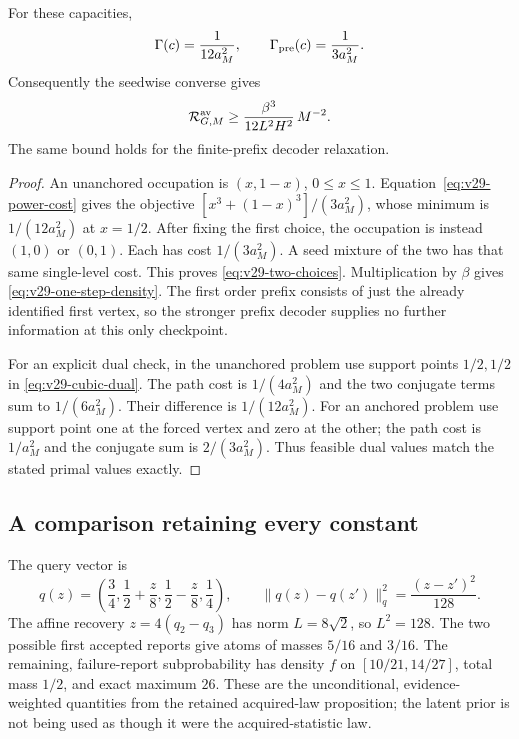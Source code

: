 \begin{proposition}
\label{prop:v29-two-choices}
For these capacities,
\begin{equation}\label{eq:v29-two-choices}
 \Gamma(c)=\frac1{12a_M^2},\qquad
 \Gamma_{\rm pre}(c)=\frac1{3a_M^2}.
\end{equation}
Consequently the seedwise converse gives
\begin{equation}\label{eq:v29-one-step-density}
           \mathcal R^{\rm av}_{G,M}
                         \ge\frac{\beta^3}{12L^2H^2}\,M^{-2}.
\end{equation}
The same bound holds for the finite-prefix decoder relaxation.
\end{proposition}
\begin{proof}
An unanchored occupation is $(x,1-x)$, $0\le x\le1$.
Equation~\eqref{eq:v29-power-cost} gives the objective
$[x^3+(1-x)^3]/(3a_M^2)$, whose minimum is $1/(12a_M^2)$ at $x=1/2$.
After fixing the first choice, the occupation is instead $(1,0)$ or
$(0,1)$. Each has cost $1/(3a_M^2)$. A seed mixture of the two has
that same single-level cost. This proves \eqref{eq:v29-two-choices}.
Multiplication by $\beta$ gives \eqref{eq:v29-one-step-density}.
The first order prefix consists of just the already identified first
vertex, so the stronger prefix decoder supplies no further information
at this only checkpoint.

For an explicit dual check, in the unanchored problem use support
points $1/2,1/2$ in \eqref{eq:v29-cubic-dual}. The path cost is
$1/(4a_M^2)$ and the two conjugate terms sum to $1/(6a_M^2)$.
Their difference is $1/(12a_M^2)$. For an anchored problem use support
point one at the forced vertex and zero at the other; the path cost is
$1/a_M^2$ and the conjugate sum is $2/(3a_M^2)$.
Thus feasible dual values match the stated primal values exactly.
\end{proof}

\subsection{A comparison retaining every constant}
The query vector is
\[
 q(z)=\left(\frac34,\frac12+\frac z8,
                    \frac12-\frac z8,\frac14\right),
 \qquad \|q(z)-q(z')\|_q^2=\frac{(z-z')^2}{128}.
\]
The affine recovery $z=4(q_2-q_3)$ has norm $L=8\sqrt2$, so $L^2=128$.
The two possible first accepted reports give atoms of masses $5/16$ and
$3/16$. The remaining, failure-report subprobability has density $f$
on $[10/21,14/27]$, total mass $1/2$, and exact maximum $26$.
These are the unconditional, evidence-weighted quantities from the
retained acquired-law proposition; the latent prior is not being used
as though it were the acquired-statistic law.

